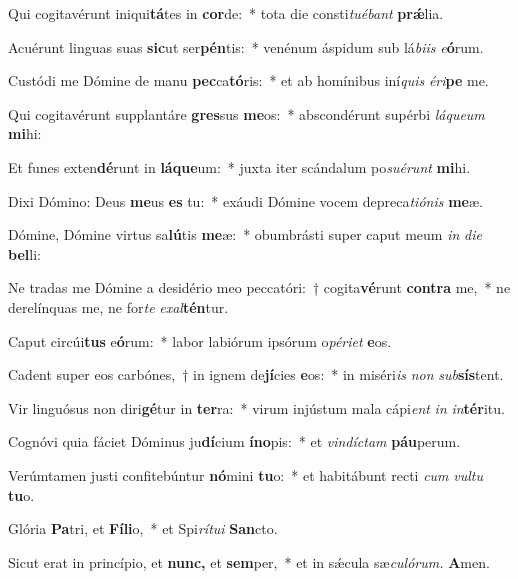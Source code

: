 \item Qui cogitavérunt iniqui\textbf{tá}tes in \textbf{cor}de:~* tota die consti\tinyhspace\textit{tuébant} \textbf{prǽ}lia.
\item Acuérunt linguas suas \textbf{sic}ut ser\textbf{pén}tis:~* venénum áspidum sub lá\textit{biis} \textit{e}\textbf{ó}rum.
\item Custódi me Dómine de manu \textbf{pec}ca\textbf{tó}ris:~* et ab homínibus iní\tinyhspace\textit{quis} \textit{éri}\textbf{pe} me.
\item Qui cogitavérunt supplantáre \textbf{gres}sus \textbf{me}os:~* abscondérunt supérbi \textit{láqueum} \textbf{mi}hi:
\item Et funes exten\textbf{dé}runt in \textbf{lá}\textbf{que}um:~* juxta iter scándalum po\tinyhspace\textit{suérunt} \textbf{mi}hi.
\item Dixi Dómino: Deus \textbf{me}us \textbf{es} tu:~* exáudi Dómine vocem depreca\tinyhspace\textit{tiónis} \textbf{me}æ.
\item Dómine, Dómine virtus sa\textbf{lú}tis \textbf{me}æ:~* obumbrásti super caput meum \textit{in} \textit{die} \textbf{bel}li:
\item Ne tradas me Dómine a desidério meo peccatóri:~† cogita\textbf{vé}runt \textbf{con}\textbf{tra} me,~* ne derelínquas me, ne for\textit{te} \textit{exal}\textbf{tén}tur.
\item Caput circúi\textbf{tus} e\textbf{ó}rum:~* labor labiórum ipsórum o\textit{périet} \textbf{e}os.
\item Cadent super eos carbónes,~† in ignem de\textbf{jí}cies \textbf{e}os:~* in miséri\textit{is} \textit{non} \textit{sub}\textbf{sís}tent.
\item Vir linguósus non diri\textbf{gé}tur in \textbf{ter}ra:~* virum injústum mala cápi\tinyhspace\textit{ent} \textit{in} \textit{in}\textbf{tér}itu.
\item Cognóvi quia fáciet Dóminus ju\textbf{dí}cium \textbf{ín}\textbf{o}pis:~* et \textit{vindíctam} \textbf{páu}perum.
\item Verúmtamen justi confitebúntur \textbf{nó}mini \textbf{tu}o:~* et habitábunt recti \textit{cum} \textit{vultu} \textbf{tu}o.
\item Glória \textbf{Pa}tri, et \textbf{Fí}\textbf{li}o,~* et Spi\tinyhspace\textit{rítui} \textbf{San}cto.
\item Sicut erat in princípio, et \textbf{nunc,} et \textbf{sem}per,~* et in sǽcula sæ\tinyhspace\textit{culórum.} \textbf{A}men.